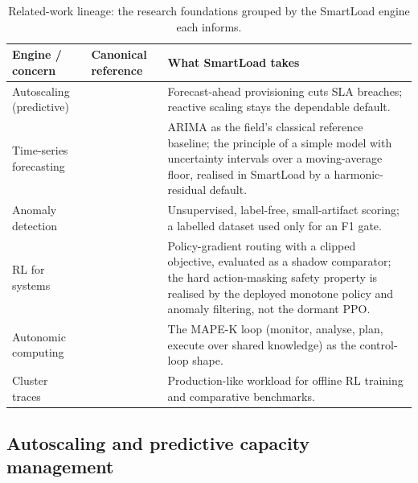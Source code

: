 \begin{table}[H]
\centering
\caption[Related-work lineage by SmartLoad engine]{Related-work lineage: the research foundations grouped by the SmartLoad engine each informs.}
\label{lit:tab:lineage}
\small
\begin{tabularx}{\linewidth}{@{}llX@{}}
\toprule
\headrow
\textbf{Engine / concern} & \textbf{Canonical reference} & \textbf{What SmartLoad takes} \\
\midrule
Autoscaling (predictive) &
\cite{lorido2014autoscaling, roy2011autoscaling} &
Forecast-ahead provisioning cuts SLA breaches; reactive scaling stays the
dependable default. \\
\addlinespace
Time-series forecasting &
\cite{box2015timeseries, hyndman2021forecasting} &
ARIMA as the field's classical reference baseline; the principle of a simple
model with uncertainty intervals over a moving-average floor, realised in
SmartLoad by a harmonic-residual default. \\
\addlinespace
Anomaly detection &
\cite{liu2008isolationforest, su2019omnianomaly} &
Unsupervised, label-free, small-artifact scoring; a labelled dataset used only
for an F1 gate. \\
\addlinespace
RL for systems &
\cite{sutton2018rl, schulman2017ppo, raffin2021sb3} &
Policy-gradient routing with a clipped objective, evaluated as a shadow
comparator; the hard action-masking safety property is realised by the deployed
monotone policy and anomaly filtering, not the dormant PPO. \\
\addlinespace
Autonomic computing &
\cite{kephart2003autonomic, ibm2005mapek} &
The MAPE-K loop (monitor, analyse, plan, execute over shared knowledge) as the
control-loop shape. \\
\addlinespace
Cluster traces &
\cite{verma2015borg, tirmazi2020borg, guo2019alibaba} &
Production-like workload for offline RL training and comparative benchmarks. \\
\bottomrule
\end{tabularx}
\end{table}

\subsection{Autoscaling and predictive capacity management}
\label{lit:sec:research-autoscale}

